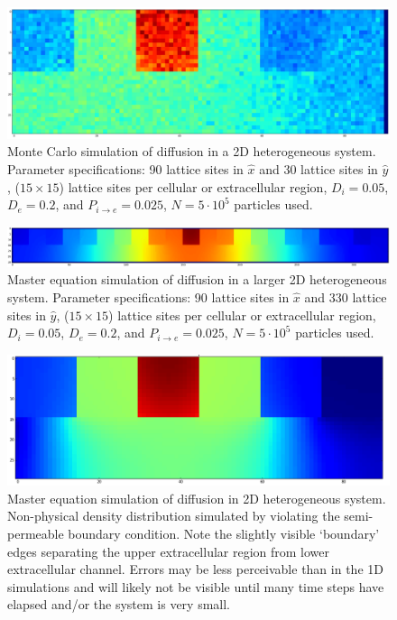 	\begin{figure}[h!]
		\centering
		\includegraphics[width=1.0\linewidth]{../images/2D/MC_heterogeneous_3U_2D}
		\caption{Monte Carlo simulation of diffusion in a 2D heterogeneous system. Parameter specifications: 90 lattice sites in $ \hat{x} $ and 30 lattice sites in $ \hat{y} $, ($ 15 \times 15 $) lattice sites per cellular or extracellular region, $ D_i = 0.05 $, $ D_e = 0.2 $, and $ P_{i\rightarrow e} = 0.025 $, $ N = 5 \cdot 10^5 $ particles used.}
		\label{fig:MC_heterogeneous_3U_2D}
	\end{figure}
	
	\begin{figure}[h!]
		\centering
		\includegraphics[width=1.0\linewidth]{../images/2D/heterogeneous_11U_2D}
		\caption{Master equation simulation of diffusion in a larger 2D heterogeneous system. Parameter specifications: 90 lattice sites in $ \hat{x} $ and 330 lattice sites in $ \hat{y} $, ($ 15 \times 15 $) lattice sites per cellular or extracellular region, $ D_i = 0.05 $, $ D_e = 0.2 $, and $ P_{i\rightarrow e} = 0.025 $, $ N = 5 \cdot 10^5 $ particles used.}
		\label{fig:heterogeneous_11U_2D}
	\end{figure}
	
	\begin{figure}[h!]
		\centering
		\includegraphics[width=1.0\linewidth]{../images/2D/error_in_diffusion}
		\caption{Master equation simulation of diffusion in 2D heterogeneous system. Non-physical density distribution simulated by violating the semi-permeable boundary condition. Note the slightly visible `boundary' edges separating the upper extracellular region from lower extracellular channel. Errors may be less perceivable than in the 1D simulations and will likely not be visible until many time steps have elapsed and/or the system is very small.}
		\label{fig:error_in_diffusion}
	\end{figure}

